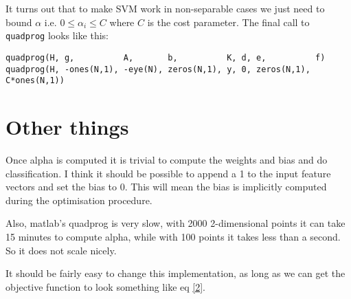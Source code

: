 \documentclass[a4paper,10pt]{article}
\begin{document}
It turns out that to make SVM work in non-separable cases we just need to bound $\alpha$ i.e. $0 \leq \alpha_i \leq C$ where $C$ is the cost parameter. The final call to \texttt{quadprog} looks like this:
\begin{verbatim}
quadprog(H, g,          A,       b,          K, d, e,          f)
quadprog(H, -ones(N,1), -eye(N), zeros(N,1), y, 0, zeros(N,1), C*ones(N,1))
\end{verbatim}

\section{Other things}
Once alpha is computed it is trivial to compute the weights and bias and do classification. I think it should be possible to append a 1 to the input feature vectors and set the bias to 0.
This will mean the bias is implicitly computed during the optimisation procedure. 

Also, matlab's quadprog is very slow, with 2000 2-dimensional points it can take 15 minutes to compute alpha, while with 100 points it takes less than a second. So it does not scale 
nicely.

It should be fairly easy to change this implementation, as long as we can get the objective function to look something like eq \ref{2}. 
\end{document}
